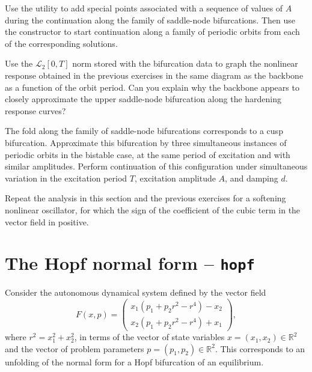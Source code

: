 \begin{exercises}

\item Use the  utility to add special points associated with a sequence of values of $A$ during the continuation along the family of saddle-node bifurcations. Then use the  constructor to start continuation along a family of periodic orbits from each of the corresponding solutions.

\item Use the $\mathcal{L}_2[0,T]$ norm stored with the bifurcation data to graph the nonlinear response obtained in the previous exercises in the same diagram as the backbone as a function of the orbit period. Can you explain why the backbone appears to closely approximate the upper saddle-node bifurcation along the hardening response curves?

\item The fold along the family of saddle-node bifurcations corresponds to a cusp bifurcation. Approximate this bifurcation by three simultaneous instances of periodic orbits in the bistable case, at the same period of excitation and with similar amplitudes. Perform continuation of this configuration under simultaneous variation in the excitation period $T$, excitation amplitude $A$, and damping $d$.

\item Repeat the analysis in this section and the previous exercises for a softening nonlinear oscillator, for which the sign of the coefficient of the cubic term in the vector field in positive.

\end{exercises}

\section{The Hopf normal form -- \texttt{hopf}}
Consider the autonomous dynamical system defined by the vector field
\begin{equation}
F(x,p) = \left(\begin{array}{c}x_1(p_1+p_2r^2-r^4)-x_2\\x_2(p_1+p_2r^2-r^4)+x_1\end{array}\right),
\label{eq:hopf}
\end{equation}
where $r^2=x_1^2+x_2^2$, in terms of the vector of state variables $x=(x_1,x_2)\in\mathbb{R}^2$ and the vector of problem parameters $p=(p_1,p_2)\in\mathbb{R}^2$. This corresponds to an unfolding of the normal form for a Hopf bifurcation of an equilibrium.

